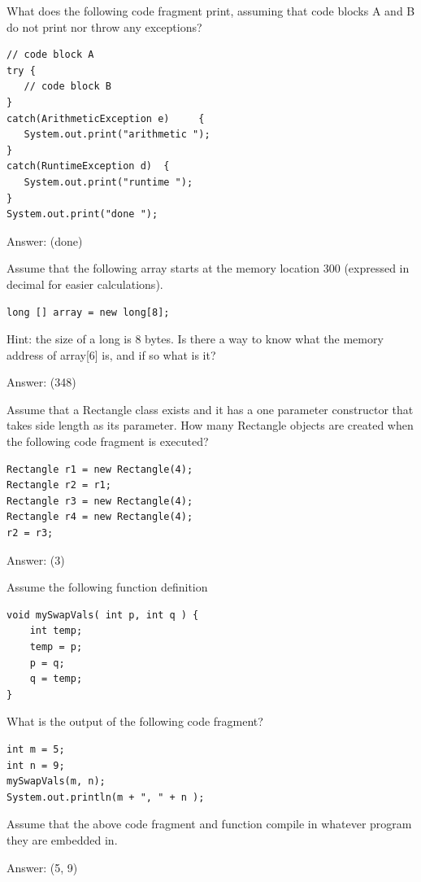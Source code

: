 \begin{question}
What does the following code fragment print, assuming that code blocks A and B do not print nor throw any exceptions?

\begin{lstlisting}
// code block A
try {
   // code block B
}
catch(ArithmeticException e)     {
   System.out.print("arithmetic ");
}
catch(RuntimeException d)  {
   System.out.print("runtime ");
}
System.out.print("done ");
\end{lstlisting}

Answer: \underline{\hspace{1in}} \ifanswers (done)\fi
\end{question}

\begin{question}
Assume that the following array starts at the memory location 300 (expressed in decimal for easier calculations).

\begin{lstlisting}
long [] array = new long[8];
\end{lstlisting}

Hint: the size of a long is 8 bytes.
Is there a way to know what the memory address of array[6] is, and if so what is it?

Answer: \underline{\hspace{1in}} \ifanswers (348)\fi
\end{question}

\begin{question}
Assume that a Rectangle class exists and it has a one parameter constructor that takes side length as its parameter. How many Rectangle objects are created when the following code fragment is executed?

\begin{lstlisting}
Rectangle r1 = new Rectangle(4);
Rectangle r2 = r1;
Rectangle r3 = new Rectangle(4);
Rectangle r4 = new Rectangle(4);
r2 = r3;
\end{lstlisting}

Answer: \underline{\hspace{1in}} \ifanswers (3)\fi
\end{question}

\begin{question}
Assume the following function definition

\begin{lstlisting}
void mySwapVals( int p, int q ) {
    int temp;
    temp = p;
    p = q;
    q = temp;
}
\end{lstlisting}

What is the output of the following code fragment?

\begin{lstlisting}
int m = 5;
int n = 9;
mySwapVals(m, n);
System.out.println(m + ", " + n );
\end{lstlisting}

Assume that the above code fragment and function compile in whatever program they are embedded in.

Answer: \underline{\hspace{1in}} \ifanswers (5, 9)\fi
\end{question}

